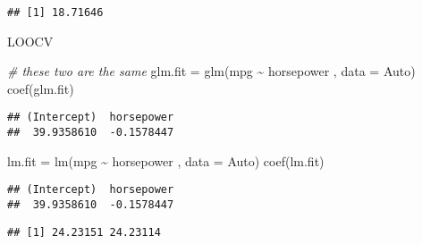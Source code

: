 \documentclass[
]{article}
\newenvironment{Shaded}{\begin{snugshade}}{\end{snugshade}}
\newcommand{\AttributeTok}[1]{\textcolor[rgb]{0.77,0.63,0.00}{#1}}
\newcommand{\CommentTok}[1]{\textcolor[rgb]{0.56,0.35,0.01}{\textit{#1}}}
\newcommand{\ControlFlowTok}[1]{\textcolor[rgb]{0.13,0.29,0.53}{\textbf{#1}}}
\newcommand{\DecValTok}[1]{\textcolor[rgb]{0.00,0.00,0.81}{#1}}
\newcommand{\FloatTok}[1]{\textcolor[rgb]{0.00,0.00,0.81}{#1}}
\newcommand{\FunctionTok}[1]{\textcolor[rgb]{0.00,0.00,0.00}{#1}}
\newcommand{\NormalTok}[1]{#1}
\newcommand{\OtherTok}[1]{\textcolor[rgb]{0.56,0.35,0.01}{#1}}
\newcommand{\SpecialCharTok}[1]{\textcolor[rgb]{0.00,0.00,0.00}{#1}}
\begin{document}
\begin{verbatim}
## [1] 18.71646
\end{verbatim}

LOOCV

\begin{Shaded}
\begin{Highlighting}[]
\CommentTok{\# these two are the same}
\NormalTok{glm.fit }\OtherTok{=} \FunctionTok{glm}\NormalTok{(mpg }\SpecialCharTok{\textasciitilde{}}\NormalTok{ horsepower , }\AttributeTok{data =}\NormalTok{ Auto)}
\FunctionTok{coef}\NormalTok{(glm.fit)}
\end{Highlighting}
\end{Shaded}

\begin{verbatim}
## (Intercept)  horsepower 
##  39.9358610  -0.1578447
\end{verbatim}

\begin{Shaded}
\begin{Highlighting}[]
\NormalTok{lm.fit }\OtherTok{=} \FunctionTok{lm}\NormalTok{(mpg }\SpecialCharTok{\textasciitilde{}}\NormalTok{ horsepower , }\AttributeTok{data =}\NormalTok{ Auto)}
\FunctionTok{coef}\NormalTok{(lm.fit)}
\end{Highlighting}
\end{Shaded}

\begin{verbatim}
## (Intercept)  horsepower 
##  39.9358610  -0.1578447
\end{verbatim}

\begin{Shaded}
\end{Shaded}

\begin{verbatim}
## [1] 24.23151 24.23114
\end{verbatim}

\begin{Shaded}
\end{Shaded}
\end{document}
